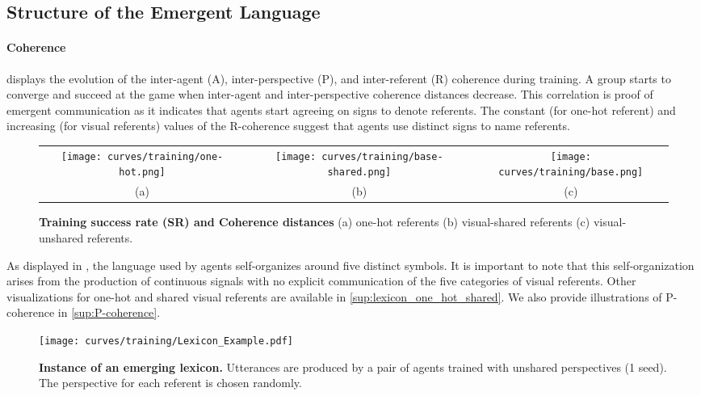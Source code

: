 \subsection{Structure of the Emergent Language}

\paragraph{Coherence}   displays the evolution of the inter-agent (A), inter-perspective (P), and inter-referent (R) coherence during training. A group starts to converge and succeed at the game when inter-agent and inter-perspective coherence distances decrease. This correlation is proof of emergent communication as it indicates that agents start agreeing on signs to denote referents. The constant (for one-hot referent) and increasing (for visual referents) values of the R-coherence suggest that agents use distinct signs to name referents.

\begin{figure*}[!h]
    \centering
    \begin{tabular}{@{}c@{}c@{}c@{}}
    \texttt{[image: curves/training/one-hot.png]} &  \texttt{[image: curves/training/base-shared.png]} &
    \texttt{[image: curves/training/base.png]}\\
    (a) & (b) & (c)
    \end{tabular}
    \caption{\textbf{Training success rate (SR) and Coherence distances} (a) one-hot referents (b) visual-shared referents (c) visual-unshared referents.}
    \label{fig:conv_coher}
\end{figure*}

As displayed in , the language used by agents self-organizes around five distinct symbols. It is important to note that this self-organization arises from the production of continuous signals with no explicit communication of the five categories of visual referents. Other visualizations for one-hot and shared visual referents are available in \ap\ref{sup:lexicon_one_hot_shared}. We also provide illustrations of P-coherence in \ap\ref{sup:P-coherence}.

\begin{figure}[!h]
    \centering
    \texttt{[image: curves/training/Lexicon\_Example.pdf]}
    \caption{\textbf{Instance of an emerging lexicon.} Utterances are produced by a pair of agents trained with unshared perspectives (1 seed). The perspective for each referent is chosen randomly.}
    \label{fig:lexicon_example}
\end{figure}


